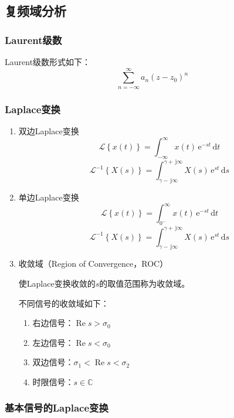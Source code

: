 \documentclass[UTF8,fontset=fandol,zihao=5]{ctexart}
\newcommand{\jj}{\,\mathrm{j}}
\newcommand{\ee}{\,\mathrm{e}}
\newcommand{\CC}{\mathbb{C}}
\newcommand{\dd}{\,\mathrm{d}}
\newcommand{\LL}{\mathcal{L}}
\newcommand{\RRe}{\operatorname{Re}}
\begin{document}
\subsection{复频域分析}

\subsubsection{Laurent级数}

Laurent级数形式如下：
\[
\sum_{n=-\infty}^{\infty} a_n (z-z_0)^n
\]

\subsubsection{Laplace变换}

\begin{enumerate}
  \item 双边Laplace变换
\[
\LL\left\{x(t)\right\}=\int_{-\infty}^{\infty} x(t) \ee^{-s t} \dd t
\]
\[
\LL^{-1}\left\{X(s)\right\}=\int_{\gamma-\jj\infty}^{\gamma+\jj\infty} X(s) \ee^{s t} \dd s
\]

  \item 单边Laplace变换
\[
\LL\left\{x(t)\right\}=\int_{0^-}^{\infty} x(t) \ee^{-s t} \dd t
\]
\[
\LL^{-1}\left\{X(s)\right\}=\int_{\gamma-\jj\infty}^{\gamma+\jj\infty} X(s) \ee^{s t} \dd s
\]

  \item 收敛域（Region of Convergence，ROC）
  
  使Laplace变换收敛的$s$的取值范围称为收敛域。

  不同信号的收敛域如下：
  \begin{enumerate}[label=(\arabic*)]
    \item 右边信号：$\RRe s>\sigma_0$
    \item 左边信号：$\RRe s<\sigma_0$
    \item 双边信号：$\sigma_1<\RRe s<\sigma_2$
    \item 时限信号：$s \in \CC$
  \end{enumerate}
\end{enumerate}

\subsubsection{基本信号的Laplace变换}
\end{document}
